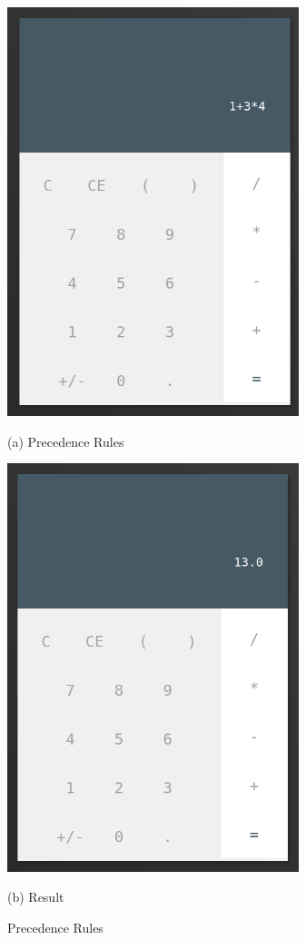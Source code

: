 \documentclass{article}
\begin{document}
\begin{normalsize}
  
  \begin{figure}[H]
    \begin{minipage}[b]{0.48\linewidth}
      \centering
      \centerline{\includegraphics[width=8.5cm]{134}}
      \centerline{ (a) Precedence Rules }\medskip
    \end{minipage}
    \hfill
    \begin{minipage}[b]{0.48\linewidth}
      \centering
      \centerline{\includegraphics[width=8.5cm]{134res}}
      \centerline{ (b) Result }\medskip
    \end{minipage}
    \caption{Precedence Rules}
  \end{figure}


\end{normalsize}
\end{document}
